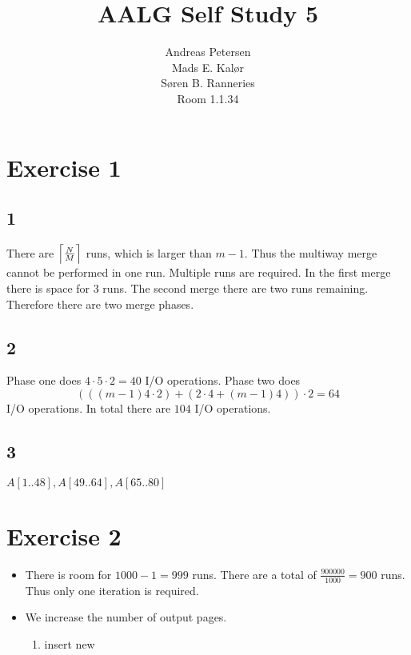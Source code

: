 \documentclass[koma,a4paper]{article}
\title{AALG Self Study 5}
\author{Andreas Petersen\\
Mads E. Kalør\\
Søren B. Ranneries\\
Room 1.1.34}
\DeclarePairedDelimiter{\ceil}{\lceil}{\rceil}
\begin{document}
\maketitle

\pagebreak

\section{Exercise 1}

\subsection{1}
There are $\ceil[\Big]{\frac{N}{M}}$ runs, which is larger than $m - 1$. Thus the multiway merge cannot be performed in one run. Multiple runs are required. In the first merge there is space for 3 runs. The second merge there are two runs remaining. Therefore there are two merge phases.

\subsection{2}
Phase one does $4 \cdot 5 \cdot 2 = 40$ I/O operations. Phase two does $$(((m - 1)4 \cdot 2) + (2 \cdot 4 + (m - 1) 4)) \cdot 2 = 64$$ I/O operations. In total there are $104$ I/O operations.

\subsection{3}
$A[1..48], A[49..64], A[65..80]$

\section{Exercise 2}
\begin{itemize}
  \item There is room for $1000-1 = 999$ runs. There are a total of $\frac{900000}{1000} = 900$ runs. Thus only one iteration is required.
  \item We increase the number of output pages.
  \begin{enumerate}
    \item insert new 
  \end{enumerate}
\end{itemize}
\end{document}
